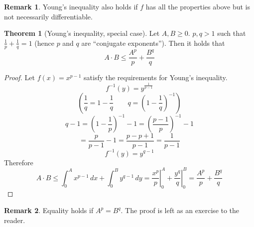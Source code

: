 \documentclass[a4paper,landscape,twocolumn]{article}
\theoremstyle{definition}
\newtheorem{theorem}{Theorem}
\newtheorem{rem}{Remark}
\begin{document}
\begin{rem}
  Young's inequality also holds if $f$ has all the properties above
  but is not necessarily differentiable.
\end{rem}
\begin{theorem}[Young's inequality, special case]
  Let $A, B \geq 0$. $p,q > 1$ such that $\frac1p + \frac1q = 1$ (hence $p$ and $q$ are \enquote{conjugate exponents}).
  Then it holds that
  \[ A \cdot B \leq \frac{A^p}{p} + \frac{B^q}{q} \]
\end{theorem}
\begin{proof}
  Let $f(x) = x^{p-1}$ satisfy the requirements for Young's inequality.
  \[ f^{-1}(y) = y^{\frac{1}{p-1}} \]
  \[ \left( \frac1q = 1 - \frac1q \qquad q = \left(1 - \frac1q\right)^{-1}\right) \]
  \[ q - 1 = \left(1 - \frac1p\right)^{-1} - 1 = \left(\frac{p-1}{p}\right)^{-1} - 1 \]
  \[ = \frac{p}{p-1} - 1 = \frac{p - p + 1}{p - 1} = \frac{1}{p-1} \]
  \[ f^{-1}(y) = y^{q-1} \]
  Therefore
  \[
    A \cdot B \leq \int_0^A x^{p-1} \, dx + \int_0^B y^{q-1} \, dy
    = \left.\frac{x^p}{p}\right|_0^A + \left.\frac{y^q}{q}\right|_0^B
    = \frac{A^p}{p} + \frac{B^q}{q}
  \]
\end{proof}
\begin{rem}
  Equality holds if $A^p = B^q$. The proof is left as an exercise to the reader.
\end{rem}
\end{document}
